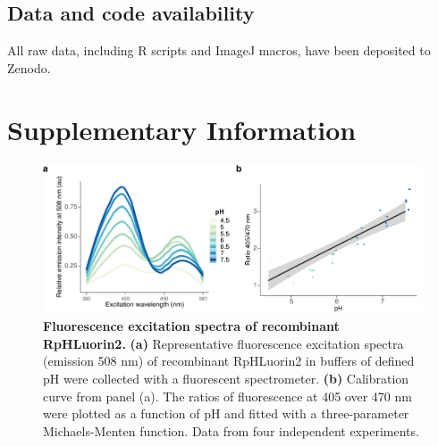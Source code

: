 \subsection{Data and code availability}

All raw data, including R scripts and ImageJ macros, have been deposited to Zenodo.


\clearpage

\section{Supplementary Information}

\begin{figure}
    \includegraphics[keepaspectratio=true,width=\textwidth,height=\textheight]{chapters/chapter3/chapter3_SupplementaryFigure1.pdf}
    \caption{\textbf{Fluorescence excitation spectra of recombinant RpHLuorin2.} \textbf{(a)} Representative fluorescence excitation spectra (emission 508 nm) of recombinant RpHLuorin2 in buffers of defined pH were collected with a fluorescent spectrometer. \textbf{(b)} Calibration curve from panel (a). The ratios of fluorescence at 405 over 470 nm were plotted as a function of pH and fitted with a three-parameter Michaels-Menten function. Data from four independent experiments.}
    \label{fig:ch3supfig1}
\end{figure}